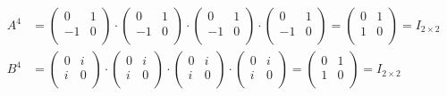 \documentclass[a4paper,12pt]{extarticle}
\theoremstyle{definition}
\begin{document}
        \begin{align*}
            A^4&=\begin{pmatrix}
        0 & 1\\
        -1 & 0\\
        \end{pmatrix}\cdot\begin{pmatrix}
        0 & 1\\
        -1 & 0\\
        \end{pmatrix}\cdot\begin{pmatrix}
        0 & 1\\
        -1 & 0\\
        \end{pmatrix}\cdot\begin{pmatrix}
        0 & 1\\
        -1 & 0\\
        \end{pmatrix}=\begin{pmatrix}
        0 & 1\\
        1 & 0\\
        \end{pmatrix}=I_{2\times2}\\
        B^4&=\begin{pmatrix}
        0 & i\\
        i & 0\\
        \end{pmatrix}\cdot\begin{pmatrix}
        0 & i\\
        i & 0\\
        \end{pmatrix}\cdot\begin{pmatrix}
        0 & i\\
        i & 0\\
        \end{pmatrix}\cdot\begin{pmatrix}
        0 & i\\
        i & 0\\
        \end{pmatrix}=\begin{pmatrix}
        0 & 1\\
        1 & 0\\
        \end{pmatrix}=I_{2\times2}
        \end{align*}
\end{document}
